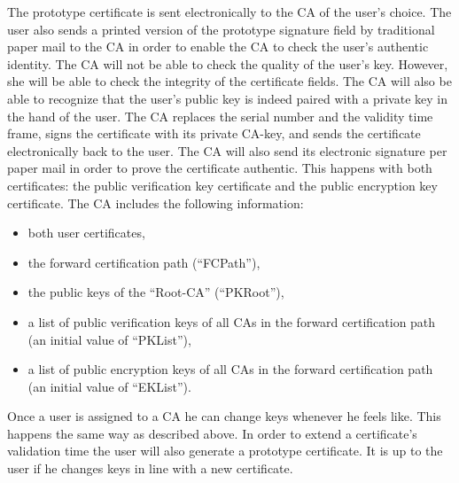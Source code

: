 The prototype certificate is sent electronically to the CA of the user's
choice. The user also sends a printed version of the prototype signature field
by traditional paper mail
to the CA in order to enable the CA to check the user's authentic
identity.
The CA will not be able to check the quality of the user's key.
However, she will be able to check the integrity of the certificate fields.
The CA will also be able to recognize
that the user's public key is indeed paired with a private
key in the hand of the user.
The CA replaces the serial number and the validity time frame,
signs the certificate with its private CA-key,
and sends the certificate electronically back to the user.
The CA will also send its electronic signature per paper mail
in order to prove the certificate authentic.
This happens with both certificates: the public verification key
certificate and the public encryption key certificate.
The CA includes the following information:

\begin{itemize}
\item both user certificates,
\item the forward certification path (``FCPath''),
\item the public keys of the ``Root-CA'' (``PKRoot''),
\item a list of public verification keys of all CAs in the
forward certification path (an initial value of ``PKList''),
\item a list of public encryption keys of all CAs in the
forward certification path (an initial value of ``EKList'').
\end{itemize}

Once a user is assigned to a CA he can change keys whenever he feels like.
This happens the same way as described above.
In order to extend a certificate's validation time the user will
also generate a prototype certificate. It is up to the user
if he changes keys in line with a new certificate.
